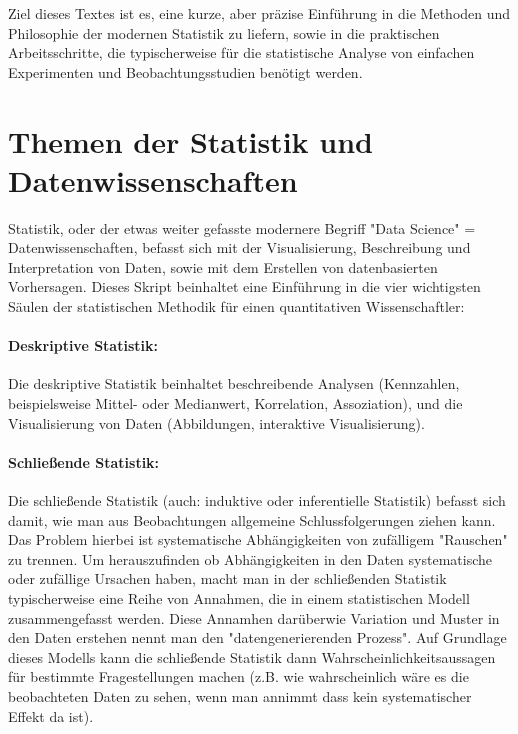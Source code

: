 \documentclass[a4paper,twoside]{tufte-book}\usepackage[]{graphicx}\usepackage[]{color}
\begin{document}
	Ziel dieses Textes ist es, eine kurze, aber präzise Einführung in die Methoden und Philosophie der modernen Statistik zu liefern, sowie in die praktischen Arbeitsschritte, die typischerweise für die statistische Analyse von einfachen Experimenten und Beobachtungsstudien benötigt werden.
	
	\section{Themen der Statistik und Datenwissenschaften}
	
	Statistik, oder der etwas weiter gefasste modernere Begriff "Data Science" = Datenwissenschaften, befasst sich mit der Visualisierung, Beschreibung und Interpretation von Daten, sowie mit dem Erstellen von datenbasierten Vorhersagen. Dieses Skript beinhaltet eine Einführung in die vier wichtigsten Säulen der statistischen Methodik für einen quantitativen Wissenschaftler:
	
	\paragraph{Deskriptive Statistik:} Die deskriptive Statistik beinhaltet beschreibende Analysen (Kennzahlen, beispielsweise Mittel- oder Medianwert, Korrelation, Assoziation), und die Visualisierung von Daten (Abbildungen, interaktive Visualisierung).
	
	\paragraph{Schließende Statistik:} Die schließende Statistik (auch: induktive oder inferentielle Statistik) befasst sich damit, wie man aus Beobachtungen allgemeine Schlussfolgerungen ziehen kann. Das Problem hierbei ist systematische Abhängigkeiten von zufälligem "Rauschen"  zu trennen. Um herauszufinden ob Abhängigkeiten in den Daten systematische oder zufällige Ursachen haben, macht man in der schließenden Statistik typischerweise eine Reihe von Annahmen, die in einem statistischen Modell zusammengefasst werden. Diese Annamhen darüberwie Variation und Muster in den Daten erstehen nennt man den "datengenerierenden Prozess". Auf Grundlage dieses Modells kann die schließende Statistik dann Wahrscheinlichkeitsaussagen für bestimmte Fragestellungen machen (z.B. wie wahrscheinlich wäre es die beobachteten Daten zu sehen, wenn man annimmt dass kein systematischer Effekt da ist). 
	
\end{document}
